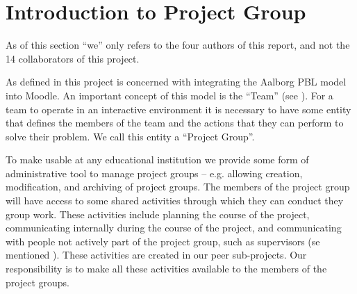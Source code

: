 \chapter{Introduction to Project Group}
\label{chap:introProjectgroup}

As of this section ``we'' only refers to the four authors of this report, and not the 14 collaborators of this project.

As defined in  this project is concerned with integrating the Aalborg PBL model into Moodle.
An important concept of this model is the ``Team'' (see ).
For a team to operate in an interactive environment it is necessary to have some entity that defines the members of the team and the actions that they can perform to solve their problem.
We call this entity a ``Project Group''.

To make \system{} usable at any educational institution we provide some form of administrative tool to manage project groups -- e.g. allowing  creation, modification, and archiving of project groups.
The members of the project group will have access to some shared activities through which they can conduct they group work.
These activities include planning the course of the project, communicating internally during the course of the project, and communicating with people not actively part of the project group, such as supervisors (se mentioned ).
These activities are created in our peer sub-projects.
Our responsibility is to make all these activities available to the members of the project groups.
	

